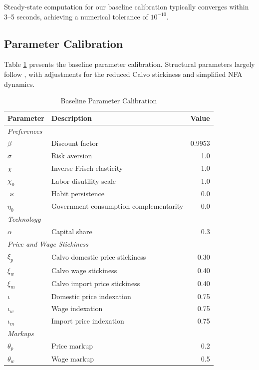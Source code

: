 \documentclass[12pt]{article}
\begin{document}
Steady-state computation for our baseline calibration typically converges within 3--5 seconds, achieving a numerical tolerance of $10^{-10}$.

\subsection{Parameter Calibration}

Table \ref{tab:calibration} presents the baseline parameter calibration. Structural parameters largely follow \citet{adrian2021quantitative}, with adjustments for the reduced Calvo stickiness and simplified NFA dynamics.

\begin{table}[H]
\centering
\caption{Baseline Parameter Calibration}\label{tab:calibration}
\small
\begin{tabular}{llr}
\toprule
\textbf{Parameter} & \textbf{Description} & \textbf{Value} \\
\midrule
\multicolumn{3}{l}{\textit{Preferences}} \\
$\beta$ & Discount factor & 0.9953 \\
$\sigma$ & Risk aversion & 1.0 \\
$\chi$ & Inverse Frisch elasticity & 1.0 \\
$\chi_0$ & Labor disutility scale & 1.0 \\
$\varkappa$ & Habit persistence & 0.0 \\
$\eta_0$ & Government consumption complementarity & 0.0 \\
\midrule
\multicolumn{3}{l}{\textit{Technology}} \\
$\alpha$ & Capital share & 0.3 \\
\midrule
\multicolumn{3}{l}{\textit{Price and Wage Stickiness}} \\
$\xi_p$ & Calvo domestic price stickiness & 0.30 \\
$\xi_w$ & Calvo wage stickiness & 0.40 \\
$\xi_m$ & Calvo import price stickiness & 0.40 \\
$\iota$ & Domestic price indexation & 0.75 \\
$\iota_w$ & Wage indexation & 0.75 \\
$\iota_m$ & Import price indexation & 0.75 \\
\midrule
\multicolumn{3}{l}{\textit{Markups}} \\
$\theta_p$ & Price markup & 0.2 \\
$\theta_w$ & Wage markup & 0.5 \\

\end{tabular}
\end{table}
\end{document}
